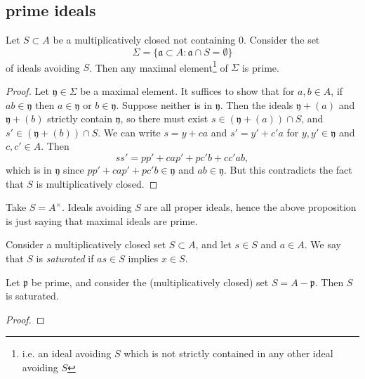\documentclass[12pt]{article}
\begin{document}

\subsection{prime ideals} %

\begin{proposition}[Krull]
\label{prop_krull}
	Let $S\subset A$ be a multiplicatively closed not containing 0. Consider the set 
	\begin{equation*}
		\Sigma = \{\mathfrak{a}\subset A : \mathfrak{a}\cap S=\emptyset \}
	\end{equation*}
	of ideals avoiding $S$. Then any {maximal element}\footnote{i.e. an ideal avoiding $S$ which is not strictly contained in any other ideal avoiding $S$} of $\Sigma$ is prime.
\end{proposition}
\begin{proof}
	Let $\mathfrak{y}\in\Sigma$ be a maximal element. It suffices to show that for $a,b\in A$, if $ab\in\mathfrak{y}$ then $a\in\mathfrak{y}$ or $b\in\mathfrak{y}$. Suppose neither is in $\mathfrak{y}$. Then the ideals $\mathfrak{y}+(a)$ and $\mathfrak{y}+(b)$ strictly contain $\mathfrak{y}$, so there must exist $s\in (\mathfrak{y}+(a))\cap S$, and $s'\in (\mathfrak{y}+(b))\cap S$. We can write $s=y+ca$ and $s'=y'+c'a$ for $y,y'\in\mathfrak{y}$ and $c,c'\in A$. Then 
	\begin{equation*}
		ss' = pp' + cap' + pc'b + cc'ab,
	\end{equation*}
	which is in $\mathfrak{y}$ since $pp' + cap' + pc'b\in\mathfrak{y}$ and $ab\in\mathfrak{y}$. But this contradicts the fact that $S$ is multiplicatively closed.
\end{proof}

\begin{example}
	Take $S=A^\times$. Ideals avoiding $S$ are all proper ideals, hence the above proposition is just saying that maximal ideals are prime.
\end{example}

\begin{definition}
	Consider a multiplicatively closed set $S\subset A$, and let $s\in S$ and $a\in A$. We say that $S$ is \emph{saturated} if $as\in S$ implies $x\in S$.
\end{definition}

\begin{proposition}
	Let $\mathfrak{p}$ be prime, and consider the (multiplicatively closed) set $S = A-\mathfrak{p}$. Then $S$ is saturated.
\end{proposition}
\begin{proof}
\end{proof}
\end{document}
